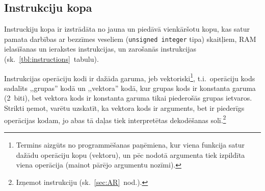 \subsection{Instrukciju kopa} \label{sec:instrSet}

Instruckiju kopa ir izstrādāta no jauna un piedāvā vienkāršotu kopu, kas
satur pamata darbības ar bezzīmes veseliem (\texttt{unsigned integer} tipa)
skaitļiem, RAM ielasīšanas un ierakstes instrukcijas, un zarošanās
instrukcijas (sk.~\ref{tbl:instructions}~tabulu).

Instrukcijas operāciju kodi ir dažāda garuma, jeb vektoriski\footnote{%
	Termins aizgūts no programmēšanas paņēmiena, kur viena funkcija
	satur dažādu operāciju kopu (vektoru), un pēc nodotā argumenta tiek
	izpildīta viena operācija (mainot pārējo argumentu nozīmi).},
t.i.~operāciju kods sadalīts ,,grupas'' kodā un ,,vektora'' kodā, kur
grupas kods ir konstanta garuma (2~biti), bet vektora kods ir konstanta
garuma tikai piederošās grupas ietvaros. Strikti ņemot, varētu uzskatīt, ka
vektora kods ir arguments, bet ir piederīgs operācijas
kodam, jo abas tā daļas tiek interpretētas dekodēšanas solī.\footnote{%
	Izņemot  instrukciju (sk.~\ref{sec:AR}~nod.).}

